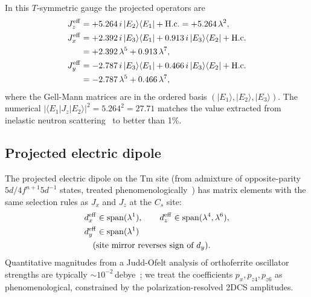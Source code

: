 \documentclass[reprint,amsmath,amssymb,aps,prb,longbibliography]{revtex4-2}
\begin{document}
In this $T$-symmetric gauge the projected operators are
\begin{equation}
\begin{aligned}
J_z^{\rm eff} &= +5.264\,i\,|E_2\rangle\langle E_1| + \mathrm{H.c.}
= +5.264\,\lambda^2,\\
J_x^{\rm eff} &= +2.392\,i\,|E_3\rangle\langle E_1| + 0.913\,i\,|E_3\rangle\langle E_2| + \mathrm{H.c.}\\
&= +2.392\,\lambda^5 + 0.913\,\lambda^7,\\
J_y^{\rm eff} &= -2.787\,i\,|E_3\rangle\langle E_1| + 0.466\,i\,|E_3\rangle\langle E_2| + \mathrm{H.c.}\\
&= -2.787\,\lambda^5 + 0.466\,\lambda^7,
\end{aligned}
\label{eq:Jeff}
\end{equation}
where the Gell-Mann matrices are in the ordered basis
$(|E_1\rangle,|E_2\rangle,|E_3\rangle)$. The numerical
$|\langle E_1|J_z|E_2\rangle|^2 = 5.264^2 = 27.71$ matches the value
extracted from inelastic neutron scattering~\cite{Skorobogatov2020} to
better than 1\%.

\subsection{Projected electric dipole}
The projected electric dipole on the Tm site (from admixture of opposite-parity 
$5d/4f^{n+1}5d^{-1}$ states, treated phenomenologically~\cite{JuddOfelt}) 
has matrix elements with the same selection rules as $J_x$ and $J_z$ at the
$C_s$ site:
\begin{equation}
\begin{aligned}
&d_x^{\rm eff} \in \mathrm{span}(\lambda^1),\qquad
d_z^{\rm eff} \in \mathrm{span}(\lambda^4,\lambda^6),\\
&d_y^{\rm eff} \in \mathrm{span}(\lambda^1)\\
&\quad(\text{site mirror reverses sign of }d_y).
\end{aligned}
\label{eq:deff}
\end{equation}
Quantitative magnitudes from a Judd-Ofelt analysis of orthoferrite
oscillator strengths are typically $\sim 10^{-2}$\,debye~\cite{Wood1968}; we
treat the coefficients $p_x, p_{z4}, p_{z6}$ as phenomenological,
constrained by the polarization-resolved 2DCS amplitudes.
\end{document}
